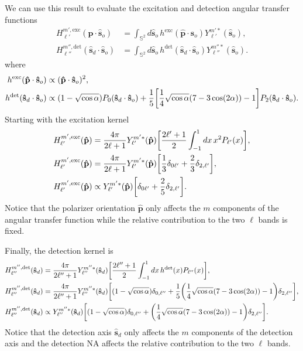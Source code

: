 \documentclass[11pt]{article}
\providecommand{\so}{\mathbf{\hat{s}}_o}
\providecommand{\sd}{\mathbf{\hat{s}}_d}
\providecommand{\pp}{\mathbf{\hat{p}}}
\providecommand{\mbb}[1]{\mathbb{#1}}
\providecommand{\ints}[1]{\int_{\mbb{S}^{#1}}}
\let\originalleft\left
\let\originalright\right
\renewcommand{\left}{\mathopen{}\mathclose\bgroup\originalleft}
\renewcommand{\right}{\aftergroup\egroup\originalright}
\begin{document}
We can use this result to evaluate the excitation and detection angular transfer
functions
\begin{align}
  H_{\ell'}^{m',\text{exc}}(\pp\cdot\so) &= \ints{2}d\so\, h^{\text{exc}}(\pp\cdot\so)Y_{\ell'}^{m'*}(\so),\\
  H_{\ell''}^{m'',\text{det}}(\sd\cdot\so) &= \ints{2}d\so\, h^{\text{det}}(\sd\cdot\so)Y_{\ell''}^{m''*}(\so).
\end{align}
where
\begin{align}
  h^{\text{exc}}(\pp\cdot\so) &\propto (\pp\cdot\so)^2, \\
  h^{\text{det}}(\sd\cdot\so) &\propto (1 - \sqrt{\cos\alpha})P_0(\sd\cdot\so) + \frac{1}{5}\left[\frac{1}{4}\sqrt{\cos\alpha}(7-3\cos(2\alpha)) - 1\right]P_2(\sd\cdot\so).
\end{align}
Starting with the excitation kernel
\begin{align}
  H_{\ell'}^{m',\text{exc}}(\pp) &= \frac{4\pi}{2\ell + 1}Y_{\ell'}^{m'*}(\pp)\left[\frac{2\ell' + 1}{2}\int_{-1}^1dx\, x^2P_{\ell'}(x)\right],\\
  H_{\ell'}^{m',\text{exc}}(\pp) &=\frac{4\pi}{2\ell + 1}Y_{\ell'}^{m'*}(\pp)\left[\frac{1}{3}\delta_{0\ell'} + \frac{2}{3}\delta_{2,\ell'}\right],\\
  H_{\ell'}^{m',\text{exc}}(\pp) &\propto Y_{\ell'}^{m'*}(\pp)\left[\delta_{0\ell'} + \frac{2}{5}\delta_{2,\ell'}\right].
\end{align}
Notice that the polarizer orientation $\pp$ only affects the $m$ components of
the angular transfer function while the relative contribution to the two $\ell$ bands is fixed.

Finally, the detection kernel is
\begin{align}
  H_{\ell''}^{m'',\text{det}}(\sd) &= \frac{4\pi}{2\ell'' + 1}Y_{\ell''}^{m''*}(\sd)\left[\frac{2\ell'' + 1}{2}\int_{-1}^1dx\, h^{\text{det}}(x)P_{\ell''}(x)\right],\\
  H_{\ell''}^{m'',\text{det}}(\sd) &= \frac{4\pi}{2\ell'' + 1}Y_{\ell''}^{m''*}(\sd)\left[(1 - \sqrt{\cos\alpha})\delta_{0,\ell''} + \frac{1}{5}\left(\frac{1}{4}\sqrt{\cos\alpha}(7-3\cos(2\alpha)) - 1\right)\delta_{2,\ell''}\right],\\
  H_{\ell''}^{m'',\text{det}}(\sd) &\propto Y_{\ell''}^{m''*}(\sd)\left[(1 - \sqrt{\cos\alpha})\delta_{0,\ell''} + \left(\frac{1}{4}\sqrt{\cos\alpha}(7-3\cos(2\alpha)) - 1\right)\delta_{2,\ell''}\right].
\end{align}
Notice that the detection axis $\sd$ only affects the $m$ components of the
detection axis and the detection NA affects the relative contribution to the two $\ell$ bands. 
\end{document}
